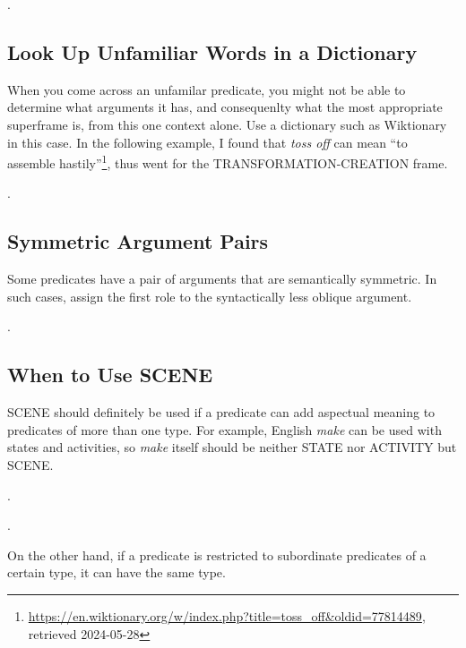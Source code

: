 \documentclass[a4paper]{article}
\newcommand{\fr}[1]{\textsf{#1}}
\begin{document}
\ex.

\newpage\subsection{Look Up Unfamiliar Words in a Dictionary}

When you come across an unfamilar predicate, you might not be able to determine
what arguments it has, and consequenlty what the most appropriate superframe is,
from this one context alone. Use a dictionary such as Wiktionary in this case.
In the following example, I found that \emph{toss off} can mean ``to assemble
hastily''\footnote{\url{https://en.wiktionary.org/w/index.php?title=toss\_off\&oldid=77814489}, retrieved 2024-05-28},
thus went for the \fr{TRANSFORMATION-CREATION} frame.

\ex.

\newpage\subsection{Symmetric Argument Pairs}

Some predicates have a pair of arguments that are semantically symmetric. In
such cases, assign the first role to the syntactically less oblique argument.

\ex.

\newpage\subsection{When to Use \fr{SCENE}}

\fr{SCENE} should definitely be used if a predicate can add aspectual meaning
to predicates of more than one type. For example, English \emph{make} can be
used with states and activities, so \emph{make} itself should be neither
\fr{STATE} nor \fr{ACTIVITY} but \fr{SCENE}.

\ex.

\ex.

On the other hand, if a predicate is restricted to subordinate predicates of a
certain type, it can have the same type.
\end{document}
